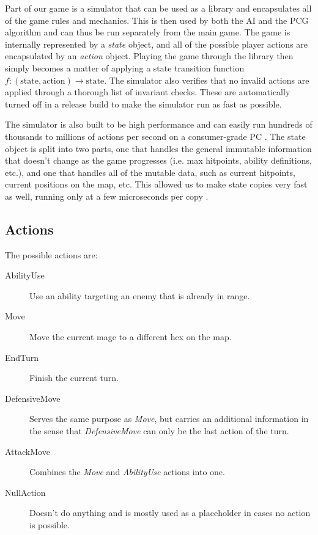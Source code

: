 Part of our game is a simulator that can be used as a library and encapsulates
all of the game rules and mechanics. This is then used by both the AI and the
PCG algorithm and can thus be run separately from the main game. The game is
internally represented by a \emph{state} object, and all of the possible player
actions are encapsulated by an \emph{action} object.  Playing the game through
the library then simply becomes a matter of applying a state transition
function $f: (\text{state}, \text{action}) \rightarrow \text{state}$. The
simulator also verifies that no invalid actions are applied through a thorough
list of invariant checks. These are automatically turned off in a release build
to make the simulator run as fast as possible.

The simulator is also built to be high performance and can easily run hundreds
of thousands to millions of actions per second on a consumer-grade PC
. The state object is split into two parts, one that handles the
general immutable information that doesn't change as the game progresses (i.e.
max hitpoints, ability definitions, etc.), and one that handles all of the
mutable data, such as current hitpoints, current positions on the map, etc.
This allowed us to make state copies very fast as well, running only at a few
microseconds per copy .

\subsection{Actions}
The possible actions are:

\begin{description}
\item [AbilityUse] Use an ability targeting an enemy that is already in range.
\item [Move] Move the current mage to a different hex on the map.
\item [EndTurn] Finish the current turn.
\item [DefensiveMove] Serves the same purpose as \emph{Move}, but carries an
additional information in the sense that \emph{DefensiveMove} can only be
the last action of the turn.
\item [AttackMove] Combines the \emph{Move} and \emph{AbilityUse} actions into one.
\item [NullAction] Doesn't do anything and is mostly used as a placeholder in cases no action is possible.
\end{description}
